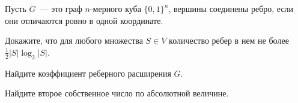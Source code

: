 Пусть $G$~--- это граф $n$-мерного куба $\{0, 1\}^n$, вершины соединены ребро, если они отличаются ровно в одной координате.
\begin{enumcyr}
    \item Докажите, что для любого множества $S \in V$ количество ребер в нем не более $\frac{1}{2} |S| \log_2|S|$.
    \item Найдите коэффициент реберного расширения $G$.
    \item Найдите второе собственное число по абсолютной величине.
\end{enumcyr}